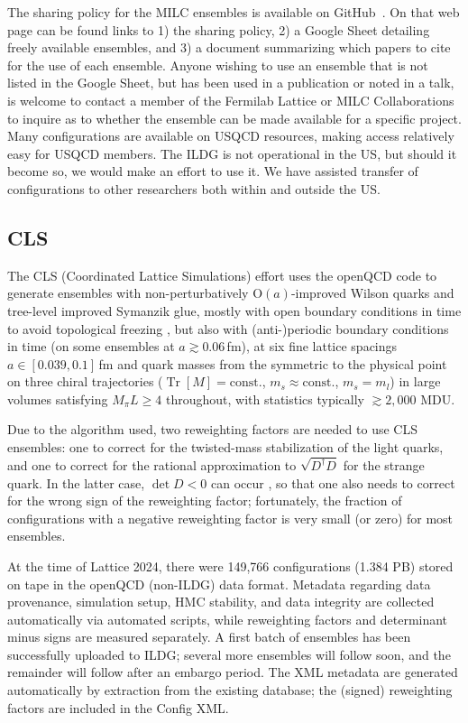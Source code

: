 \documentclass[a4paper,11pt]{article}
\begin{document}
The sharing policy for the MILC ensembles is available on
GitHub~\cite{MILC:policy}. On that web page can be found links to 1)
the sharing policy, 2) a Google Sheet detailing freely available
ensembles, and 3) a document summarizing which papers to cite for the
use of each ensemble.  Anyone wishing to use an ensemble that is not
listed in the Google Sheet, but has been used in a publication or
noted in a talk, is welcome to contact a member of the Fermilab
Lattice or MILC Collaborations to inquire as to whether the ensemble
can be made available for a specific project.  Many configurations are
available on USQCD resources, making access relatively easy for USQCD
members.  The ILDG is not operational in the US, but should it become
so, we would make an effort to use it.  We have assisted transfer of
configurations to other researchers both within and outside the US.

\subsection{CLS}
The CLS (Coordinated Lattice Simulations) effort uses the openQCD code
\cite{openqcd} to generate ensembles
\cite{Bruno:2014jqa,Mohler:2017wnb} with  non-perturbatively
$\mathrm{O}(a)$-improved Wilson quarks and tree-level improved
Symanzik glue, mostly with open boundary conditions in time to avoid
topological freezing \cite{Schaefer:2010hu,Luscher:2012av}, but also
with (anti-)periodic boundary conditions in time (on some ensembles at
$a\gtrsim 0.06\,$fm), at six fine lattice spacings
$a\in[0.039,0.1]$\,fm and quark masses from the symmetric to the
physical point on three chiral trajectories
($\mathop{\mathrm{Tr}}[M]=\mathrm{const.}$,
$m_s\approx\mathrm{const.}$, $m_s=m_l$) in large volumes satisfying
$M_\pi L\ge4$ throughout, with statistics typically $\gtrsim 2,000$
MDU.

Due to the algorithm used, two reweighting factors are needed to use
CLS ensembles: one to correct for the twisted-mass stabilization of
the light quarks, and one to correct for the rational approximation to
$\sqrt{D^{\dagger}D}$ for the strange quark.  In the latter case,
$\det D<0$ can occur \cite{Mohler:2020txx}, so that one also needs to
correct for the wrong sign of the reweighting factor; fortunately, the
fraction of configurations with a negative reweighting factor is very
small (or zero) for most ensembles.

At the time of Lattice 2024, there were 149,766 configurations (1.384
PB) stored on tape in the openQCD (non-ILDG) data format.  Metadata
regarding data provenance, simulation setup, HMC stability, and data
integrity are collected automatically via automated scripts, while
reweighting factors and determinant minus signs are measured
separately.  A first batch of ensembles has been successfully uploaded
to ILDG; several more ensembles will follow soon, and the remainder
will follow after an embargo period.  The XML metadata are generated
automatically by extraction from the existing database; the (signed)
reweighting factors are included in the Config XML.
\end{document}
